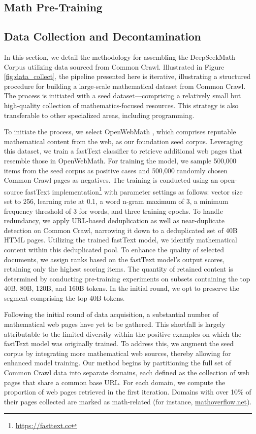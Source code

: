 \begin{itemize}[topsep=0pt]
\section{Math Pre-Training}

\subsection{Data Collection and Decontamination} In this section, we detail the methodology for assembling the DeepSeekMath Corpus utilizing data sourced from Common Crawl. Illustrated in Figure \ref{fig:data_collect}, the pipeline presented here is iterative, illustrating a structured procedure for building a large-scale mathematical dataset from Common Crawl. The process is initiated with a seed dataset—comprising a relatively small but high-quality collection of mathematics-focused resources. This strategy is also transferable to other specialized areas, including programming.

To initiate the process, we select OpenWebMath \citep{openwebmath}, which comprises reputable mathematical content from the web, as our foundation seed corpus. Leveraging this dataset, we train a fastText classifier \citep{joulin2016fasttext} to retrieve additional web pages that resemble those in OpenWebMath. For training the model, we sample 500,000 items from the seed corpus as positive cases and 500,000 randomly chosen Common Crawl pages as negatives. The training is conducted using an open-source fastText implementation\footnote{\url{https://fasttext.cc}} with parameter settings as follows: vector size set to 256, learning rate at 0.1, a word n-gram maximum of 3, a minimum frequency threshold of 3 for words, and three training epochs. To handle redundancy, we apply URL-based deduplication as well as near-duplicate detection on Common Crawl, narrowing it down to a deduplicated set of 40B HTML pages. Utilizing the trained fastText model, we identify mathematical content within this deduplicated pool. To enhance the quality of selected documents, we assign ranks based on the fastText model’s output scores, retaining only the highest scoring items. The quantity of retained content is determined by conducting pre-training experiments on subsets containing the top 40B, 80B, 120B, and 160B tokens. In the initial round, we opt to preserve the segment comprising the top 40B tokens.

Following the initial round of data acquisition, a substantial number of mathematical web pages have yet to be gathered. This shortfall is largely attributable to the limited diversity within the positive examples on which the fastText model was originally trained. To address this, we augment the seed corpus by integrating more mathematical web sources, thereby allowing for enhanced model training. Our method begins by partitioning the full set of Common Crawl data into separate domains, each defined as the collection of web pages that share a common base URL. For each domain, we compute the proportion of web pages retrieved in the first iteration. Domains with over 10\% of their pages collected are marked as math-related (for instance, \url{mathoverflow.net}).


\end{itemize}
